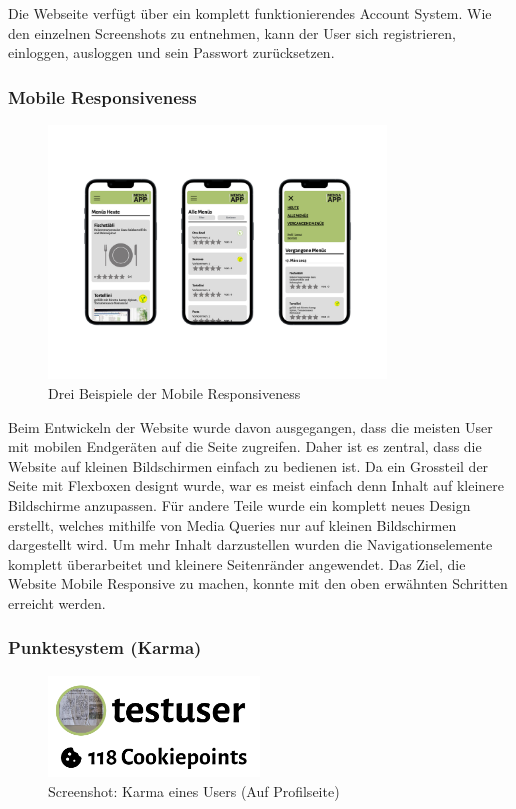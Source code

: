 Die Webseite verfügt über ein komplett funktionierendes Account System. Wie den
einzelnen Screenshots zu entnehmen, kann der User sich registrieren, einloggen,
ausloggen und sein Passwort zurücksetzen.

\subsubsection*{Mobile Responsiveness}

\begin{figure}[ht]
    \centering
    \includegraphics[width=0.8\textwidth]{images/Resultat_Responsive.png}
    \caption{Drei Beispiele der Mobile Responsiveness}
    \label{fig:r-karma}
\end{figure}

Beim Entwickeln der Website wurde davon ausgegangen, dass die meisten User mit
mobilen Endgeräten auf die Seite zugreifen. Daher ist es zentral, dass die
Website auf kleinen Bildschirmen einfach zu bedienen ist. Da ein Grossteil der
Seite mit Flexboxen designt wurde, war es meist einfach denn Inhalt auf kleinere
Bildschirme anzupassen. Für andere Teile wurde ein komplett neues Design
erstellt, welches mithilfe von Media Queries nur auf kleinen Bildschirmen
dargestellt wird. Um mehr Inhalt darzustellen wurden die Navigationselemente
komplett überarbeitet und kleinere Seitenränder angewendet. Das Ziel, die
Website Mobile Responsive zu machen, konnte mit den oben erwähnten Schritten
erreicht werden.


\subsubsection*{Punktesystem (Karma)}

\begin{figure}[ht]
    \centering
    \includegraphics[width=0.5\textwidth]{images/Resultat_Karma.png}
    \caption{Screenshot: Karma eines Users (Auf Profilseite)}
    \label{fig:r-karma}
\end{figure}

